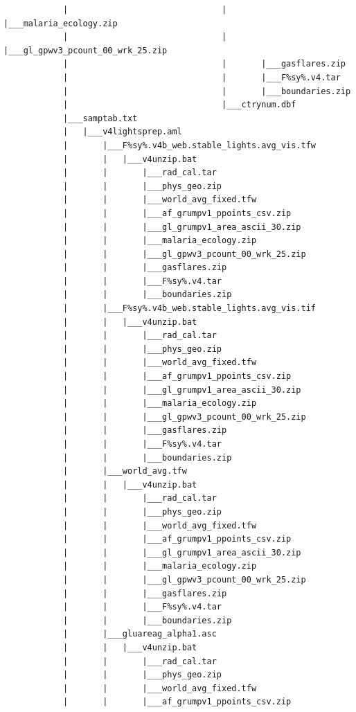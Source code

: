 \documentclass[]{book}
\begin{document}
\begin{verbatim}
            |                               |       |___malaria_ecology.zip
            |                               |       |___gl_gpwv3_pcount_00_wrk_25.zip
            |                               |       |___gasflares.zip
            |                               |       |___F%sy%.v4.tar
            |                               |       |___boundaries.zip
            |                               |___ctrynum.dbf
            |___samptab.txt
            |   |___v4lightsprep.aml
            |       |___F%sy%.v4b_web.stable_lights.avg_vis.tfw
            |       |   |___v4unzip.bat
            |       |       |___rad_cal.tar
            |       |       |___phys_geo.zip
            |       |       |___world_avg_fixed.tfw
            |       |       |___af_grumpv1_ppoints_csv.zip
            |       |       |___gl_grumpv1_area_ascii_30.zip
            |       |       |___malaria_ecology.zip
            |       |       |___gl_gpwv3_pcount_00_wrk_25.zip
            |       |       |___gasflares.zip
            |       |       |___F%sy%.v4.tar
            |       |       |___boundaries.zip
            |       |___F%sy%.v4b_web.stable_lights.avg_vis.tif
            |       |   |___v4unzip.bat
            |       |       |___rad_cal.tar
            |       |       |___phys_geo.zip
            |       |       |___world_avg_fixed.tfw
            |       |       |___af_grumpv1_ppoints_csv.zip
            |       |       |___gl_grumpv1_area_ascii_30.zip
            |       |       |___malaria_ecology.zip
            |       |       |___gl_gpwv3_pcount_00_wrk_25.zip
            |       |       |___gasflares.zip
            |       |       |___F%sy%.v4.tar
            |       |       |___boundaries.zip
            |       |___world_avg.tfw
            |       |   |___v4unzip.bat
            |       |       |___rad_cal.tar
            |       |       |___phys_geo.zip
            |       |       |___world_avg_fixed.tfw
            |       |       |___af_grumpv1_ppoints_csv.zip
            |       |       |___gl_grumpv1_area_ascii_30.zip
            |       |       |___malaria_ecology.zip
            |       |       |___gl_gpwv3_pcount_00_wrk_25.zip
            |       |       |___gasflares.zip
            |       |       |___F%sy%.v4.tar
            |       |       |___boundaries.zip
            |       |___gluareag_alpha1.asc
            |       |   |___v4unzip.bat
            |       |       |___rad_cal.tar
            |       |       |___phys_geo.zip
            |       |       |___world_avg_fixed.tfw
            |       |       |___af_grumpv1_ppoints_csv.zip

\end{verbatim}
\end{document}
